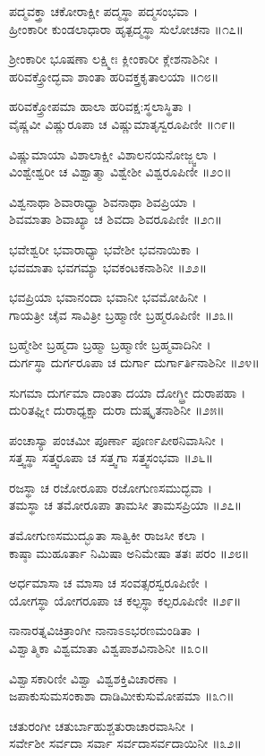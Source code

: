 ಪದ್ಮವಕ್ತ್ರಾ ಚಕೋರಾಕ್ಷೀ ಪದ್ಮಸ್ಥಾ ಪದ್ಮಸಂಭವಾ ।\\
ಹ್ರೀಂಕಾರೀ ಕುಂಡಲಾಧಾರಾ ಹೃತ್ಪದ್ಮಸ್ಥಾ ಸುಲೋಚನಾ ॥೧೭॥

ಶ್ರೀಂಕಾರೀ ಭೂಷಣಾ ಲಕ್ಷ್ಮೀಃ ಕ್ಲೀಂಕಾರೀ ಕ್ಲೇಶನಾಶಿನೀ ।\\
ಹರಿವಕ್ತ್ರೋದ್ಭವಾ ಶಾಂತಾ ಹರಿವಕ್ತ್ರಕೃತಾಲಯಾ ॥೧೮॥

ಹರಿವಕ್ತ್ರೋಪಮಾ ಹಾಲಾ ಹರಿವಕ್ಷ:ಸ್ಥಲಾಸ್ಥಿತಾ ।\\
ವೈಷ್ಣವೀ ವಿಷ್ಣುರೂಪಾ ಚ ವಿಷ್ಣುಮಾತೃಸ್ವರೂಪಿಣೀ ॥೧೯॥

ವಿಷ್ಣುಮಾಯಾ ವಿಶಾಲಾಕ್ಷೀ ವಿಶಾಲನಯನೋಜ್ಜ್ವಲಾ ।\\
ವಿಂಶ್ವೇಶ್ವರೀ ಚ ವಿಶ್ವಾತ್ಮಾ ವಿಶ್ವೇಶೀ ವಿಶ್ವರೂಪಿಣೀ ॥೨೦॥

ವಿಶ್ವನಾಥಾ ಶಿವಾರಾಧ್ಯಾ ಶಿವನಾಥಾ ಶಿವಪ್ರಿಯಾ ।\\
ಶಿವಮಾತಾ ಶಿವಾಖ್ಯಾ ಚ ಶಿವದಾ ಶಿವರೂಪಿಣೀ ॥೨೧॥

ಭವೇಶ್ವರೀ ಭವಾರಾಧ್ಯಾ ಭವೇಶೀ ಭವನಾಯಿಕಾ ।\\
ಭವಮಾತಾ ಭವಗಮ್ಯಾ ಭವಕಂಟಕನಾಶಿನೀ ॥೨೨॥

ಭವಪ್ರಿಯಾ ಭವಾನಂದಾ ಭವಾನೀ ಭವಮೋಹಿನೀ ।\\
ಗಾಯತ್ರೀ ಚೈವ ಸಾವಿತ್ರೀ ಬ್ರಹ್ಮಾಣೀ ಬ್ರಹ್ಮರೂಪಿಣೀ ॥೨೩॥

ಬ್ರಹ್ಮೇಶೀ ಬ್ರಹ್ಮದಾ ಬ್ರಹ್ಮಾ ಬ್ರಹ್ಮಾಣೀ ಬ್ರಹ್ಮವಾದಿನೀ ।\\
ದುರ್ಗಸ್ಥಾ ದುರ್ಗರೂಪಾ ಚ ದುರ್ಗಾ ದುರ್ಗಾರ್ತಿನಾಶಿನೀ ॥೨೪॥

ಸುಗಮಾ ದುರ್ಗಮಾ ದಾಂತಾ ದಯಾ ದೋಗ್ಧ್ರೀ ದುರಾಪಹಾ ।\\
ದುರಿತಘ್ನೀ ದುರಾಧ್ಯಕ್ಷಾ ದುರಾ ದುಷ್ಕೃತನಾಶಿನೀ ॥೨೫॥

ಪಂಚಾಸ್ಯಾ ಪಂಚಮೀ ಪೂರ್ಣಾ ಪೂರ್ಣಪೀಠನಿವಾಸಿನೀ ।\\
ಸತ್ತ್ವಸ್ಥಾ ಸತ್ತ್ವರೂಪಾ ಚ ಸತ್ತ್ವಗಾ ಸತ್ತ್ವಸಂಭವಾ ॥೨೬॥

ರಜಸ್ಥಾ ಚ ರಜೋರೂಪಾ ರಜೋಗುಣಸಮುದ್ಭವಾ ।\\
ತಮಸ್ಥಾ ಚ ತಮೋರೂಪಾ ತಾಮಸೀ ತಾಮಸಪ್ರಿಯಾ ॥೨೭॥

ತಮೋಗುಣಸಮುದ್ಭೂತಾ ಸಾತ್ವಿಕೀ ರಾಜಸೀ ಕಲಾ ।\\
ಕಾಷ್ಠಾ ಮುಹೂರ್ತಾ ನಿಮಿಷಾ ಅನಿಮೇಷಾ ತತಃ ಪರಂ ॥೨೮॥

ಅರ್ಧಮಾಸಾ ಚ ಮಾಸಾ ಚ ಸಂವತ್ಸರಸ್ವರೂಪಿಣೀ ।\\
ಯೋಗಸ್ಥಾ ಯೋಗರೂಪಾ ಚ ಕಲ್ಪಸ್ಥಾ ಕಲ್ಪರೂಪಿಣೀ ॥೨೯॥

ನಾನಾರತ್ನವಿಚಿತ್ರಾಂಗೀ ನಾನಾಽಽಭರಣಮಂಡಿತಾ ।\\
ವಿಶ್ವಾತ್ಮಿಕಾ ವಿಶ್ವಮಾತಾ ವಿಶ್ವಪಾಶವಿನಾಶಿನೀ ॥೩೦॥

ವಿಶ್ವಾಸಕಾರಿಣೀ ವಿಶ್ವಾ ವಿಶ್ವಶಕ್ತಿವಿಚಾರಣಾ ।\\
ಜಪಾಕುಸುಮಸಂಕಾಶಾ ದಾಡಿಮೀಕುಸುಮೋಪಮಾ ॥೩೧॥

ಚತುರಂಗೀ ಚತುರ್ಬಾಹುಶ್ಚತುರಾಚಾರವಾಸಿನೀ ।\\
ಸರ್ವೇಶೀ ಸರ್ವದಾ ಸರ್ವಾ ಸರ್ವದಾಸರ್ವದಾಯಿನೀ ॥೩೨॥

